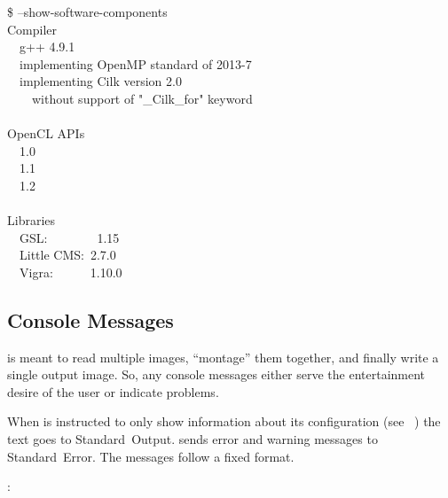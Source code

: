 \begin{exemplar}
  \begin{terminal}
    \$ \app{} --show-software-components \\
    Compiler \\
    ~~g++ 4.9.1 \\
    ~~implementing OpenMP standard of 2013-7 \\
    ~~implementing Cilk version 2.0 \\
    ~~~~without support of "\_Cilk\_for" keyword \\
    ~ \\
    OpenCL APIs \\
    ~~1.0 \\
    ~~1.1 \\
    ~~1.2  \\
    ~ \\
    Libraries \\
    ~~GSL:~~~~~~~~1.15 \\
    ~~Little CMS:~2.7.0 \\
    ~~Vigra:~~~~~~1.10.0
  \end{terminal}

  \caption[Output of ]%
          {\label{ex:show-software-components}%
            Output of \appcmd{} when asked to reveal the compiler that was used to build it
            along with the libraries it was linked against.}
\end{exemplar}


\subsection[Console Messages]{\label{sec:console-messages}%
  Console Messages}

\App{} is meant to read multiple images, ``montage'' them together, and finally write a single
output image.  So, any console messages either serve the entertainment desire of the user or
indicate problems.

%
When \appcmd{} is instructed to only show information about its configuration (see
\sectionName~) the text goes to Standard~Output.  \appcmd{}
sends error and warning messages to Standard~Error.  The messages follow a fixed format.

\begin{literal}
  \app:  
\end{literal}

